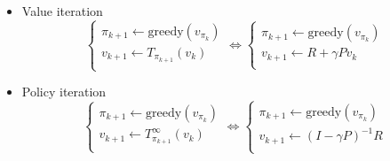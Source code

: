 \documentclass[10pt]{beamer}
\theoremstyle{remark}
\begin{document}
\begin{frame}
    \begin{itemize}
        \item Value iteration
    \[
    \begin{cases}
        \pi_{k+1} \leftarrow \text{greedy}(v_{\pi_k}) \\
        v_{k+1} \leftarrow T_{\pi_{k+1}}(v_{k}) \\
    \end{cases}
    \Leftrightarrow
    \begin{cases}
        \pi_{k+1} \leftarrow \text{greedy}(v_{\pi_k}) \\
        v_{k+1} \leftarrow R + \gamma P v_{k} \\
    \end{cases}
    \] 
\item Policy iteration
    \[
    \begin{cases}
        \pi_{k+1} \leftarrow \text{greedy}(v_{\pi_k}) \\
        v_{k+1} \leftarrow T_{\pi_{k+1}}^{\infty}(v_{k}) \\
    \end{cases}
    \Leftrightarrow
    \begin{cases}
        \pi_{k+1} \leftarrow \text{greedy}(v_{\pi_k}) \\
        v_{k+1} \leftarrow (I - \gamma P)^{-1}R \\
    \end{cases}
    \] 
    \end{itemize}
\end{frame}
\end{document}
